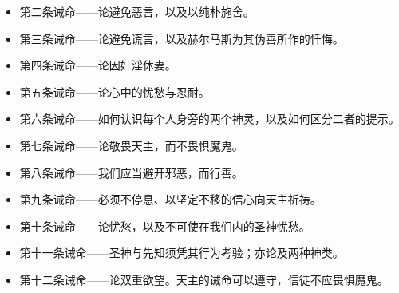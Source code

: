 \begin{itemize}
\item 第二条诫命——论避免恶言，以及以纯朴施舍。
\end{itemize}

\begin{itemize}
\item 第三条诫命——论避免谎言，以及赫尔马斯为其伪善所作的忏悔。
\end{itemize}

\begin{itemize}
\item 第四条诫命——论因奸淫休妻。
\end{itemize}

\begin{itemize}
\item 第五条诫命——论心中的忧愁与忍耐。
\end{itemize}

\begin{itemize}
\item 第六条诫命——如何认识每个人身旁的两个神灵，以及如何区分二者的提示。
\end{itemize}

\begin{itemize}
\item 第七条诫命——论敬畏天主，而不畏惧魔鬼。
\end{itemize}

\begin{itemize}
\item 第八条诫命——我们应当避开邪恶，而行善。
\end{itemize}

\begin{itemize}
\item 第九条诫命——必须不停息、以坚定不移的信心向天主祈祷。
\end{itemize}

\begin{itemize}
\item 第十条诫命——论忧愁，以及不可使在我们内的圣神忧愁。
\end{itemize}

\begin{itemize}
\item 第十一条诫命——圣神与先知须凭其行为考验；亦论及两种神类。
\end{itemize}

\begin{itemize}
\item 第十二条诫命——论双重欲望。天主的诫命可以遵守，信徒不应畏惧魔鬼。
\end{itemize}

